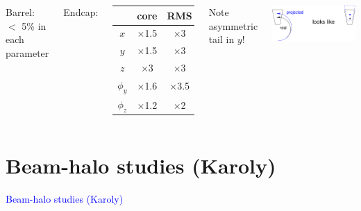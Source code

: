 \documentclass[compress]{beamer}
\begin{document}
\begin{frame}
\begin{columns}
\vspace{0.3 cm}
Barrel: $<$ 5\% in each parameter

\vspace{0.2 cm}
Endcap: \begin{tabular}{c c c}
& core & RMS \\\hline
$x$ & $\times$1.5 & $\times$3 \\
$y$ & $\times$1.5 & $\times$3 \\
$z$ & $\times$3 & $\times$3 \\
$\phi_y$ & $\times$1.6 & $\times$3.5 \\
$\phi_z$ & $\times$1.2 & $\times$2
\end{tabular}

\vspace{0.2 cm}
Note asymmetric tail in $y$!

\vspace{-0.4 cm}
\begin{center}
\includegraphics[width=0.8\linewidth]{momentum_y_explanation.pdf}
\end{center}
\end{columns}
\end{frame}

\section*{Beam-halo studies (Karoly)}

\begin{frame}
\begin{center}
\Huge \textcolor{blue}{Beam-halo studies (Karoly)}
\end{center}
\end{frame}
\end{document}

